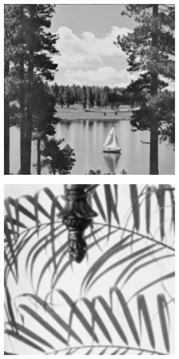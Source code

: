 \begin{figure}
\begin{subfigure}[b]{0.09\textwidth}
    \end{subfigure}
    \hfill
    \begin{subfigure}[b]{0.09\textwidth}
        \centering
        \includegraphics[width=1\textwidth]{images/pgpd/lake.png}
    \end{subfigure}
    \hfill
    \begin{subfigure}[b]{0.09\textwidth}
        \centering
        \includegraphics[width=1\textwidth]{images/pgpd/leaves.png}

\end{subfigure}
\end{figure}
